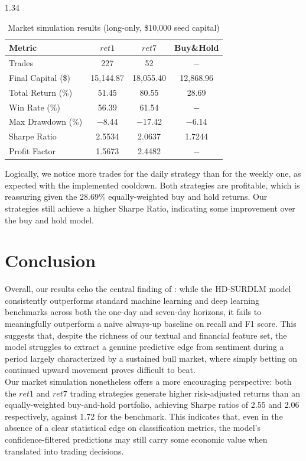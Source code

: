 \documentclass{article}
\begin{document}
\begin{setstretch}{1.34}
\begin{table}[h]
\centering
\caption{Market simulation results (long-only, \$10,000 seed capital)}
\label{tab:backtest_results}
\renewcommand{\arraystretch}{1.2}
\setlength{\tabcolsep}{8pt}
\begin{tabular}{lccc}
\toprule
Metric & $ret1$ & $ret7$ & Buy\&Hold\\
\midrule
Trades              & 227          & 52           & $-$ \\
Final Capital (\$)  & 15{,}144.87  & 18{,}055.40  & 12{,}868.96\\
Total Return (\%)   & 51.45        & 80.55        & 28.69\\
Win Rate (\%)       & 56.39        & 61.54        & $-$ \\
Max Drawdown (\%)   & $-$8.44      & $-$17.42     & $-$6.14 \\
Sharpe Ratio        & 2.5534       & 2.0637       & 1.7244 \\
Profit Factor       & 1.5673       & 2.4482       & $-$ \\
\bottomrule
\end{tabular}
\end{table}

Logically, we notice more trades for the daily strategy than for the weekly one, as expected with the implemented cooldown. Both strategies are profitable, which is reassuring given the 28.69\% equally-weighted buy and hold returns. Our strategies still achieve a higher Sharpe Ratio, indicating some improvement over the buy and hold model. 


\section{Conclusion}

Overall, our results echo the central finding of \textcite{shao2025revisiting}: while the HD-SURDLM model consistently outperforms standard machine learning and deep learning benchmarks across both the one-day and seven-day horizons, it fails to meaningfully outperform a naive always-up baseline on recall and F1 score. This suggests that, despite the richness of our textual and financial feature set, the model struggles to extract a genuine predictive edge from sentiment during a period largely characterized by a sustained bull market, where simply betting on continued upward movement proves difficult to beat. \\

Our market simulation nonetheless offers a more encouraging perspective: both the $ret1$ and $ret7$ trading strategies generate higher risk-adjusted returns than an equally-weighted buy-and-hold portfolio, achieving Sharpe ratios of 2.55 and 2.06 respectively, against 1.72 for the benchmark. This indicates that, even in the absence of a clear statistical edge on classification metrics, the model's confidence-filtered predictions may still carry some economic value when translated into trading decisions. \\


\end{setstretch}
\end{document}
